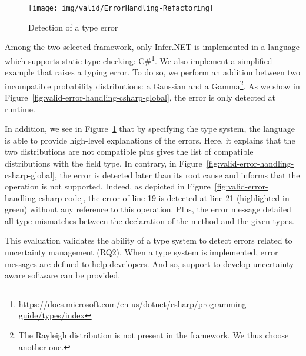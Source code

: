 \begin{figure}
    \centering
    \texttt{[image: img/valid/ErrorHandling-Refactoring]}
    \caption{Detection of a type error}
    \label{fig:valid-error-handling}
\end{figure}

Among the two selected framework, only Infer.NET is implemented in a language which supports static type checking: C\#\footnote{\url{https://docs.microsoft.com/en-us/dotnet/csharp/programming-guide/types/index}}.
We also implement a simplified example that raises a typing error.
To do so, we perform an addition between two incompatible probability distributions: a Gaussian and a Gamma\footnote{The Rayleigh distribution is not present in the framework. We thus choose another one.}.
As we show in Figure~\ref{fig:valid-error-handling-csharp-global}, the error is only detected at runtime.

\begin{figure*}[ht]
	\centering
	\hfill
	\caption{Infer.NET detect the error at runtime.}
	\label{fig:valid-error-handling-csharp-global}
\end{figure*}

In addition, we see in Figure~\ref{fig:valid-error-handling} that by specifying the type system, the language is able to provide high-level explanations of the errors.
Here, it explains that the two distributions are not compatible plus gives the list of compatible distributions with the field type.
In contrary, in Figure~\ref{fig:valid-error-handling-csharp-global}, the error is detected later than its root cause and informs that the operation is not supported.
Indeed, as depicted in Figure~\ref{fig:valid-error-handling-csharp-code}, the error of line 19 is detected at line 21 (highlighted in green) without any reference to this operation.
Plus, the error message detailed all type mismatches between the declaration of the method and the given types.

This evaluation validates the ability of a type system to detect errors related to uncertainty management (RQ2).
When a type system is implemented, error messages are defined to help developers.
And so, support to develop uncertainty-aware software can be provided. 

